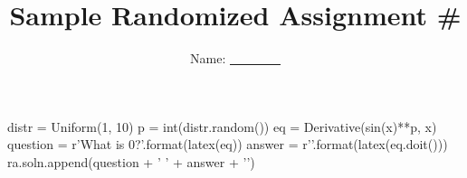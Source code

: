 \documentclass{article}
\title{Sample Randomized Assignment \#}
\author{Name: \underline{~~~~~~~~}}
\begin{document}
\maketitle

\begin{sympycode}
distr = Uniform(1, 10)
p = int(distr.random())
eq = Derivative(sin(x)**p, x)
question = r'What is ${0}$?'.format(latex(eq))
answer = r''.format(latex(eq.doit()))
ra.soln.append(question + ' ' + answer + '\n')
\end{sympycode}

\end{document}
